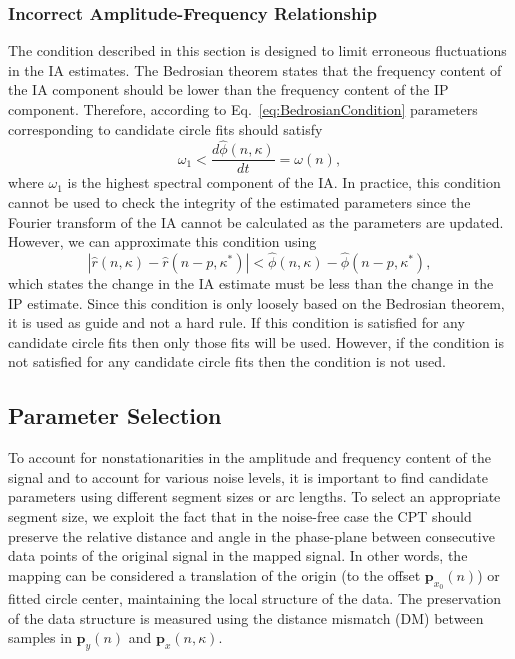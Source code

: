 \documentclass[journal,11pt,a4paper,onecolumn,draftcls]{IEEEtran}
\begin{document}
\subsubsection{Incorrect Amplitude-Frequency Relationship}
The condition described in this section is designed to limit erroneous fluctuations in the IA estimates. The Bedrosian theorem states that the frequency content of the IA component should be lower than the frequency content of the IP component. Therefore, according to Eq.~\ref{eq:BedrosianCondition} parameters corresponding to candidate circle fits should satisfy
\begin{equation}
	\omega_1 < \frac{d\hat{\phi}\left(n,\kappa \right)}{dt}=\omega(n),
\end{equation}
where $\omega_1$ is the highest spectral component of the IA. In practice, this condition cannot be used to check the integrity of the estimated parameters since the Fourier transform of the IA cannot be calculated as the parameters are updated. However, we can approximate this condition using
\begin{equation}\label{eq:Prior3}
    \left| {\hat{r}\left(n,\kappa\right) - \hat{r}\left(n-p,\kappa^*\right)} \right| < \hat{\phi}\left(n,\kappa \right) - \hat{\phi}\left(n-p,\kappa^*\right),
\end{equation}
which states the change in the IA estimate must be less than the change in the IP estimate. Since this condition is only loosely based on the Bedrosian theorem, it is used as guide and not a hard rule. If this condition is satisfied for any candidate circle fits then only those fits will be used. However, if the condition is not satisfied for any candidate circle fits then the condition is not used.

\subsection{Parameter Selection}\label{sect:BestParameters}
To account for nonstationarities in the amplitude and frequency content of the signal and to account for various noise levels, it is important to find candidate parameters using different segment sizes or arc lengths. To select an appropriate segment size, we exploit the fact that in the noise-free case the CPT should preserve the relative distance and angle in the phase-plane between consecutive data points of the original signal in the mapped signal. In other words, the mapping can be considered a translation of the origin (to the offset $\mathbf{p}_{x_0}\left(n\right)$) or fitted circle center, maintaining the local structure of the data. The preservation of the data structure is measured using the distance mismatch (DM) between samples in $\mathbf{p}_y(n)$ and $\mathbf{p}_x(n,\kappa)$. 
\end{document}
